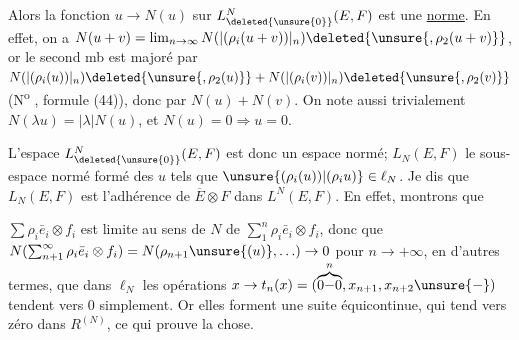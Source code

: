 
 

Alors la fonction $u\to N(u)$ sur $L^N_{\deleted{\unsure{0}}}(E,F)$ est une \uline{norme}. En effet, on a $N(u+v)=\lim_{n\to\infty}N(|(\rho_i(u+v))|_n)\deleted{\unsure{,\rho_2(u+v)}}$, or le second mb est majoré par $N(|(\rho_i(u))|_n)\deleted{\unsure{,\rho_2(u)}}+N(|(\rho_i(v))|_n)\deleted{\unsure{,\rho_2(v)}}$ (N\textsuperscript{o} , formule (44)), donc par $N(u)+N(v)$. On note aussi trivialement $N(\lambda u)=|\lambda|N(u)$, et $N(u)=0\Rightarrow u=0$.


L'espace $L^N_{\deleted{\unsure{0}}}(E,F)$ est donc un espace normé;  $L_N(E,F)$ le sous-espace normé formé des $u$ tels que $\unsure{(\rho_i(u))|(\rho_i u)}\in\ell_N$. Je dis que $L_N(E,F)$ est l'adhérence de $\overline E\otimes F$ dans $L^N(E,F)$. En effet, montrons que

$\sum\rho_i\bar e_i\otimes f_i$ est limite au sens de $N$ de $\sum_1^n\rho_i\bar e_i\otimes f_i$, donc que $N(\sum_{n+1}^\infty\rho_i\bar e_i\otimes f_i)=N(\rho_{n+1}\unsure{(u)},\ldots)\to 0$ pour $n\to+\infty$, en d'autres termes, que dans $\ell_N$ les opérations $x\to t_n(x)=(\overbrace{0{-}0}^{n},x_{n+1},x_{n+2}\unsure{-})$ tendent vers $0$ simplement. Or elles forment une suite équicontinue, qui tend vers zéro dans  $R^{(N)}$, ce qui prouve la chose. 




